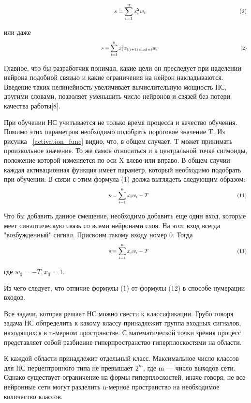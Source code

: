 \documentclass[a4paper,english,russian]{G2-105}
\begin{document}
\[
\ \hspace*{66mm} s = \sum_{i=1}^n x_{i}^{2} w_i  \ \hspace*{56mm} (2)
\] 
\par или даже
\[
\ \hspace*{66mm} s = \sum_{i=1}^n x_{i}^{2} x_{((i+1)\bmod n)} w_i  \ \hspace*{56mm} (2)
\] 
\par Главное, что бы разработчик понимал, какие цели он преследует при наделении нейрона подобной связью и какие ограничения на нейрон накладываются. Введение таких нелинейность увеличивает вычислительную мощность НС, другими словами, позволяет уменьшить число нейронов и связей без потери качества работы[8]. 
\par При обучении НС учитывается не только время процесса и качество обучения. Помимо этих параметров необходимо подобрать пороговое значение T. Из рисунка ~\ref{activation_func} видно, что, в общем случает, T может принимать произвольное значение. То же самое относиться и к центральной точке сигмоиды, положение которой изменяется по оси X влево или вправо. В общем случии каждая активационная функция имеет параметр, который необходимо подобрать при обучении. В связи с этим формула (1) должа выглядеть следующим образом:
\[
\ \hspace*{66mm} s = \sum_{i=1}^n x_{i} w_i-T \ \hspace*{56mm} (11)
\] 
\par Что бы добавить данное смещение, необходимо добавить еще один вход, которые меет синаптическую связь со всеми нейронами слоя. На этот вход всегда "возбужденный" сигнал. Присвоим такому входу номер 0. Тогда
\[
\ \hspace*{66mm} s = \sum_{i=1}^n x_{i} w_i-T \ \hspace*{56mm} (11)
\] 
\par где $w_0=-T, x_0=1.$
\par Из чего следует, что отличие формулы (1) от формулы (12) в способе нумерации входов.
\par Все задачи, которая решает НС можно свести к классификации. Грубо говоря задача НС обпределить к какому классу принадлежит группа входных сигналов, находящихся в n-мерном пространстве. С математической точки зрения процесс представляет собой разбиение гиперпространство гиперплоскостями на области.
\par К каждой области принадлежит отдельный класс. Максимальное число классов для НС перцептронного типа не превышает $2^m$, где m --- число выходов сети. Однако существует ограничение на формы гиперплоскостей, иначе говоря, не все нейронные сети могут разделить n-мерное пространство на необходимое количество классов.
\end{document}
